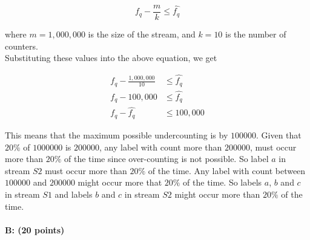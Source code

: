 \documentclass[11pt]{article}
\begin{document}
$$
f_q - \frac{m}{k} \leq \hat{f_q}
$$

where $m=1,000,000$ is the size of the stream, and $k=10$ is the number of counters.\\
Substituting these values into the above equation, we get

\begin{equation*}
\begin{aligned}
f_q - \frac{1,000,000}{10} &\leq \hat{f_q}\\
f_q - 100,000 &\leq \hat{f_q}\\
f_q - \hat{f_q}  &\leq 100,000
\end{aligned}
\end{equation*}

This means that the maximum possible undercounting is by $\num[group-separator={,}]{100000}$. Given that $20\%$ of $\num[group-separator={,}]{1000000}$ is $\num[group-separator={,}]{200000}$, any label with count more than $\num[group-separator={,}]{200000}$, must occur more than $20\%$ of the time since over-counting is not possible. So label $a$ in stream $S2$ must occur more than $20\%$ of the time. Any label with count between $\num[group-separator={,}]{100000}$ and $\num[group-separator={,}]{200000}$ might occur more that $20\%$ of the time. So labels $a$, $b$ and $c$ in stream $S1$ and labels $b$ and $c$ in stream $S2$ might occur more than $20\%$ of the time.

\paragraph{B: (20 points)}  
\end{document}
